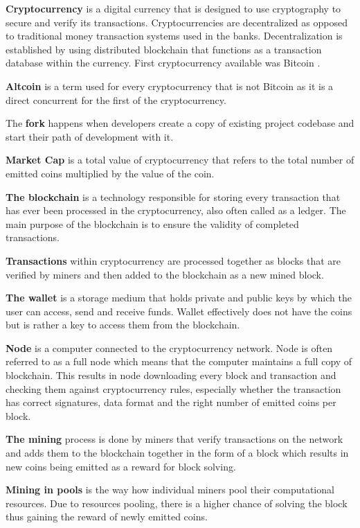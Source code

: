 \documentclass[
  printed, %
  table,   %
  nolof,     %
  nolot,     %
           oneside, color
]{fithesis3}
\begin{document}
\textbf{Cryptocurrency} is a digital currency that is designed to use cryptography to secure and verify its transactions. Cryptocurrencies are decentralized as opposed to traditional money transaction systems used in the banks. Decentralization is established by using distributed blockchain that functions as a transaction database within the currency. First cryptocurrency available was Bitcoin \cite{farell2015analysis}.

\textbf{Altcoin} is a term used for every cryptocurrency that is not Bitcoin as it is a direct concurrent for the first of the cryptocurrency.

The \textbf{fork} happens when developers create a copy of existing project codebase and start their path of development with it. 

\textbf{Market Cap} is a total value of cryptocurrency that refers to the total number of emitted coins multiplied by the value of the coin.

\textbf{The blockchain} is a technology responsible for storing every transaction that has ever been processed in the cryptocurrency, also often called as a ledger. The main purpose of the blockchain is to ensure the validity of completed transactions.

\textbf{Transactions} within cryptocurrency are processed together as blocks that are verified by miners and then added to the blockchain as a new mined block.

\textbf{The wallet} is a storage medium that holds private and public keys by which the user can access, send and receive funds. Wallet effectively does not have the coins but is rather a key to access them from the blockchain.

\textbf{Node} is a computer connected to the cryptocurrency network. Node is often referred to as a full node which means that the computer maintains a full copy of blockchain. This results in node downloading every block and transaction and checking them against cryptocurrency rules, especially whether the transaction has correct signatures, data format and the right number of emitted coins per block.

\textbf{The mining} process is done by miners that verify transactions on the network and adds them to the blockchain together in the form of a block which results in new coins being emitted as a reward for block solving.

\textbf{Mining in pools} is the way how individual miners pool their computational resources. Due to resources pooling, there is a higher chance of solving the block thus gaining the reward of newly emitted coins. %
\end{document}
